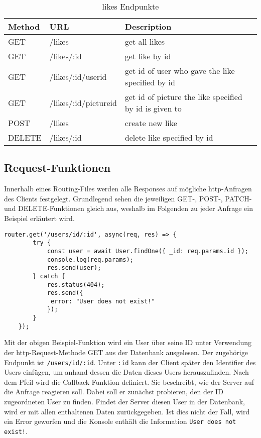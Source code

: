 \begin{table}[!htb]
    \begin{tabularx}{\textwidth}{|X|X|X|}
        \hline
        \textbf{Method} & \textbf{URL} & \textbf{Description} \\
        \hline
        \hline

    GET & /likes & get all likes\\
    \hline
    GET & /likes/:id & get like by id\\
    \hline
    GET & /likes/:id/userid & get id of user who gave the like specified by id \\
    \hline
    GET & /likes/:id/pictureid & get id of picture the like specified by id is given to\\
    \hline
    POST & /likes & create new like\\
    \hline
    DELETE & /likes/:id & delete like specified by id\\
    \hline

\end{tabularx}
\caption{likes Endpunkte}
\label{likes endpunkte}
\end{table}

\clearpage
\subsection{Request-Funktionen}
Innerhalb eines Routing-Files werden alle Responses auf mögliche http-Anfragen des Clients festgelegt. Grundlegend sehen die jeweiligen GET-, POST-, PATCH- und DELETE-Funktionen gleich aus, weshalb im Folgenden zu jeder Anfrage ein Beispiel erläutert wird.

\begin{lstlisting}[caption=GET-Request, label=lst:getrequest, float=!htb]
    router.get('/users/id/:id', async(req, res) => {
        try {
            const user = await User.findOne({ _id: req.params.id });
            console.log(req.params);
            res.send(user);
        } catch {
            res.status(404);
            res.send({
             error: "User does not exist!"
            });
        }
    });
\end{lstlisting}

Mit der obigen Beispiel-Funktion wird ein User über seine ID unter Verwendung der http-Request-Methode GET aus der Datenbank ausgelesen. Der zugehörige Endpunkt ist \texttt{/users/id/:id}. Unter \texttt{:id} kann der Client später den Identifier des Users einfügen, um anhand dessen die Daten dieses Users herauszufinden. Nach dem Pfeil wird die Callback-Funktion definiert. Sie beschreibt, wie der Server auf die Anfrage reagieren soll. Dabei soll er zunächst probieren, den der ID zugeordneten User zu finden. Findet der Server diesen User in der Datenbank, wird er mit allen enthaltenen Daten zurückgegeben. Ist dies nicht der Fall, wird ein Error geworfen und die Konsole enthält die Information \texttt{User does not exist!}.

